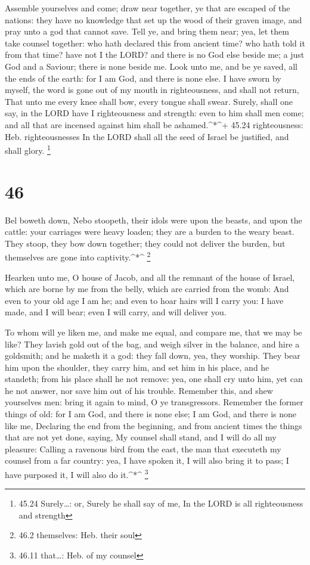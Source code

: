  Assemble yourselves and come; draw near together, ye that
are escaped of the nations: they have no knowledge that set up the wood
of their graven image, and pray unto a god that cannot save.
 Tell ye, and bring them near; yea, let them take counsel
together: who hath declared this from ancient time? who hath told it
from that time? have not I the LORD? and there is no God else beside me;
a just God and a Saviour; there is none beside me.  Look
unto me, and be ye saved, all the ends of the earth: for I am God, and
there is none else.  I have sworn by myself, the word is
gone out of my mouth in righteousness, and shall not return, That unto
me every knee shall bow, every tongue shall swear.  Surely,
shall one say, in the LORD have I righteousness and strength: even to
him shall men come; and all that are incensed against him shall be
ashamed.\^{}*\^{}+ 45.24 righteousness: Heb. righteousnesses
 In the LORD shall all the seed of Israel be justified, and
shall glory. \footnote{45.24 Surely\ldots: or, Surely he shall say of
  me, In the LORD is all righteousness and strength}

\hypertarget{section-45}{%
\section{46}\label{section-45}}

 Bel boweth down, Nebo stoopeth, their idols were upon the
beasts, and upon the cattle: your carriages were heavy loaden; they are
a burden to the weary beast.  They stoop, they bow down
together; they could not deliver the burden, but themselves are gone
into captivity.\^{}*\^{} \footnote{46.2 themselves: Heb. their soul}

 Hearken unto me, O house of Jacob, and all the remnant of
the house of Israel, which are borne by me from the belly, which are
carried from the womb:  And even to your old age I am he;
and even to hoar hairs will I carry you: I have made, and I will bear;
even I will carry, and will deliver you.

 To whom will ye liken me, and make me equal, and compare
me, that we may be like?  They lavish gold out of the bag,
and weigh silver in the balance, and hire a goldsmith; and he maketh it
a god: they fall down, yea, they worship.  They bear him
upon the shoulder, they carry him, and set him in his place, and he
standeth; from his place shall he not remove: yea, one shall cry unto
him, yet can he not answer, nor save him out of his trouble.
 Remember this, and shew yourselves men: bring it again to
mind, O ye transgressors.  Remember the former things of
old: for I am God, and there is none else; I am God, and there is none
like me,  Declaring the end from the beginning, and from
ancient times the things that are not yet done, saying, My counsel shall
stand, and I will do all my pleasure:  Calling a ravenous
bird from the east, the man that executeth my counsel from a far
country: yea, I have spoken it, I will also bring it to pass; I have
purposed it, I will also do it.\^{}*\^{} \footnote{46.11 that\ldots:
  Heb. of my counsel}

